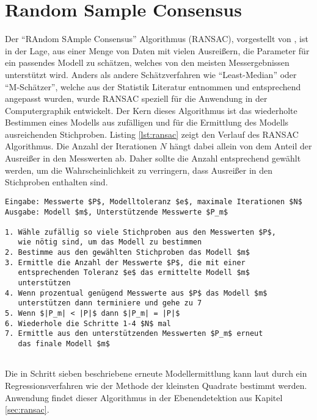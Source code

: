 \section{Random Sample Consensus} \label{sec:ransac-theory}

Der \enquote{RAndom SAmple Consensus} Algorithmus (RANSAC), vorgestellt von \citet{fischler1981random}, ist in der Lage, aus einer Menge von Daten mit vielen Ausreißern, die Parameter für ein passendes Modell zu schätzen, welches von den meisten Messergebnissen unterstützt wird. Anders als andere Schätzverfahren wie \enquote{Least-Median} oder \enquote{M-Schätzer}, welche aus der Statistik Literatur entnommen und entsprechend angepasst wurden, wurde RANSAC speziell für die Anwendung in der Computergraphik entwickelt. Der Kern dieses Algorithmus ist das wiederholte Bestimmen eines Modells aus zufälligen und für die Ermittlung des Modells ausreichenden Stichproben. Listing \ref{lst:ransac} zeigt den Verlauf des RANSAC Algorithmus. Die Anzahl der Iterationen \(N\) hängt dabei allein von dem Anteil der Ausreißer in den Messwerten ab. Daher sollte die Anzahl entsprechend gewählt werden, um die Wahrscheinlichkeit zu verringern, dass Ausreißer in den Stichproben enthalten sind. \citep{derpanis2010overview} 

\begin{lstlisting}[mathescape,caption=Der RANSAC Algorithmus, label=lst:ransac, float=htbp]
Eingabe: Messwerte $P$, Modelltoleranz $e$, maximale Iterationen $N$
Ausgabe: Modell $m$, Unterstützende Messwerte $P_m$

1. Wähle zufällig so viele Stichproben aus den Messwerten $P$,
   wie nötig sind, um das Modell zu bestimmen
2. Bestimme aus den gewählten Stichproben das Modell $m$
3. Ermittle die Anzahl der Messwerte $P$, die mit einer 
   entsprechenden Toleranz $e$ das ermittelte Modell $m$ 
   unterstützen
4. Wenn prozentual genügend Messwerte aus $P$ das Modell $m$ 
   unterstützen dann terminiere und gehe zu 7
5. Wenn $|P_m| < |P|$ dann $|P_m| = |P|$
6. Wiederhole die Schritte 1-4 $N$ mal
7. Ermittle aus den unterstützenden Messwerten $P_m$ erneut 
   das finale Modell $m$
   
\end{lstlisting} 

Die in Schritt sieben beschriebene erneute Modellermittlung kann laut \citet{fischler1981random} durch ein Regressionsverfahren wie der Methode der kleinsten Quadrate bestimmt werden. Anwendung findet dieser Algorithmus in der Ebenendetektion aus Kapitel \ref{sec:ransac}.